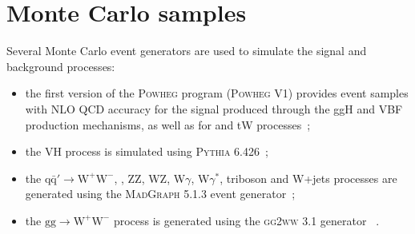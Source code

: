 %
%
%
%


\section{Monte Carlo samples\label{subsec:MC}}

Several Monte Carlo event generators are used to simulate the signal and background processes:
\begin{itemize}
\item the first version of the \textsc{Powheg} program (\textsc{Powheg V1}) provides event samples with NLO QCD accuracy for the \hww signal produced through the ggH and VBF production mechanisms, as well as for \ttbar and tW processes~\cite{Alioli:2011as};
\item the VH process is simulated using \textsc{Pythia 6.426}~\cite{Sjostrand:2006za};
\item the $\mathrm{q\bar{q}'} \to \mathrm{W^{+}W^{-}}$, \dyll, ZZ, WZ, W$\gamma$, W$\gamma^*$, triboson and W+jets processes are generated using
the \textsc{MadGraph 5.1.3} event generator~\cite{Alwall:2014hca};
\item the $\mathrm{gg\to W^{+}W^{-}}$ process is generated using the \textsc{gg2ww} 3.1 generator ~\cite{Binoth:2006mf}.
\end{itemize}

